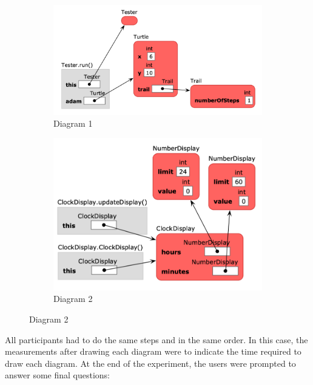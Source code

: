 \documentclass[]{usiinfbachelorproject}
\begin{document}
\begin{figure}[h!]
\centering
\begin{subfigure}{.5\textwidth}
  \centering
  \includegraphics[width=\textwidth-10pt]{figures/informa_clicker_example2.png}
  \caption{Diagram 1}
\end{subfigure}%
\begin{subfigure}{.5\textwidth}
  \centering
  \includegraphics[width=\textwidth-10pt]{figures/informa_clicker_example4.png}
  \caption{Diagram 2}
\end{subfigure}
\label{fig:test}
\end{figure}


\noindent All participants had to do the same steps and in the same order. In this case, the measurements after drawing each diagram were to indicate the time required to draw each diagram. At the end of the experiment, the users were prompted to answer some final questions:
\end{document}
